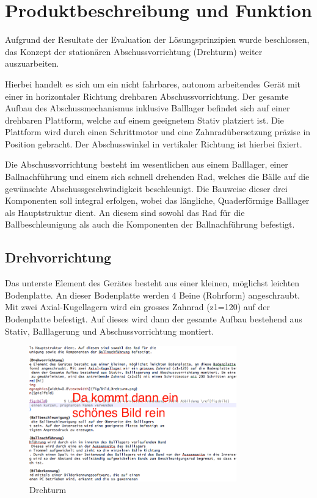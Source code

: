 \section{Produktbeschreibung und Funktion}

Aufgrund der Resultate der Evaluation der Lösungsprinzipien wurde beschlossen, 
das Konzept der stationären Abschussvorrichtung (Drehturm) weiter 
auszuarbeiten. 

Hierbei handelt es sich um ein nicht fahrbares, autonom arbeitendes Gerät mit 
einer in horizontaler Richtung drehbaren Abschussvorrichtung. Der gesamte Aufbau 
des Abschussmechanismus inklusive Balllager befindet sich auf einer drehbaren 
Plattform, welche auf einem geeignetem Stativ platziert ist. Die Plattform 
wird durch einen Schrittmotor und eine Zahnradübersetzung präzise in Position 
gebracht. Der Abschusswinkel in vertikaler Richtung ist hierbei fixiert. 

Die Abschussvorrichtung besteht im wesentlichen aus einem Balllager, einer 
Ballnachführung und einem sich schnell drehenden Rad, welches die Bälle auf 
die gewünschte Abschussgeschwindigkeit beschleunigt. Die Bauweise dieser drei 
Komponenten soll integral erfolgen, wobei das längliche, Quaderförmige 
Balllager als Hauptstruktur dient. An diesem sind sowohl das Rad für die 
Ballbeschleunigung als auch die Komponenten der Ballnachführung befestigt.

\subsection{Drehvorrichtung}
Das unterste Element des Gerätes besteht aus einer kleinen, möglichst leichten 
Bodenplatte. An dieser Bodenplatte werden 4 Beine (Rohrform) angeschraubt. Mit 
zwei Axial-Kugellagern wird ein grosses Zahnrad (z1=120) auf der Bodenplatte 
befestigt. Auf dieses wird dann der gesamte Aufbau bestehend aus Stativ, 
Balllagerung und Abschussvorrichtung montiert. 

\begin{figure}[h!]          
	\centering             
	\includegraphics[width=0.8\textwidth]{fig/Bild_Drehturm.png}    
	\caption{Drehturm}
	
	\label{fig:bild}        %
\end{figure}

